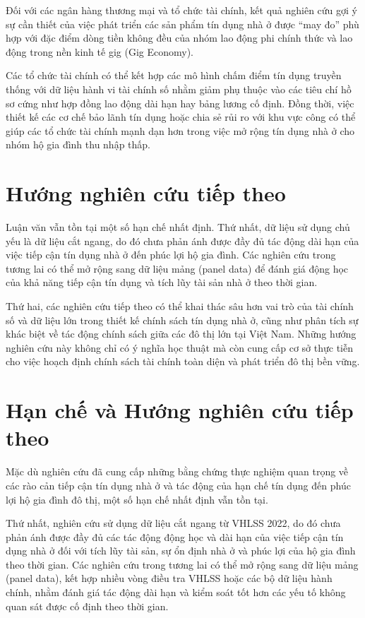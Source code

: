 \documentclass[12pt,a4paper]{report}
\begin{document}
	Đối với các ngân hàng thương mại và tổ chức tài chính, kết quả nghiên cứu gợi ý sự cần thiết của việc phát triển các sản phẩm tín dụng nhà ở được ``may đo'' phù hợp với đặc điểm dòng tiền không đều của nhóm lao động phi chính thức và lao động trong nền kinh tế gig (Gig Economy).
	
	Các tổ chức tài chính có thể kết hợp các mô hình chấm điểm tín dụng truyền thống với dữ liệu hành vi tài chính số nhằm giảm phụ thuộc vào các tiêu chí hồ sơ cứng như hợp đồng lao động dài hạn hay bảng lương cố định. Đồng thời, việc thiết kế các cơ chế bảo lãnh tín dụng hoặc chia sẻ rủi ro với khu vực công có thể giúp các tổ chức tài chính mạnh dạn hơn trong việc mở rộng tín dụng nhà ở cho nhóm hộ gia đình thu nhập thấp.
	
	\section{Hướng nghiên cứu tiếp theo}
	
	Luận văn vẫn tồn tại một số hạn chế nhất định. Thứ nhất, dữ liệu sử dụng chủ yếu là dữ liệu cắt ngang, do đó chưa phản ánh được đầy đủ tác động dài hạn của việc tiếp cận tín dụng nhà ở đến phúc lợi hộ gia đình. Các nghiên cứu trong tương lai có thể mở rộng sang dữ liệu mảng (panel data) để đánh giá động học của khả năng tiếp cận tín dụng và tích lũy tài sản nhà ở theo thời gian.
	
	Thứ hai, các nghiên cứu tiếp theo có thể khai thác sâu hơn vai trò của tài chính số và dữ liệu lớn trong thiết kế chính sách tín dụng nhà ở, cũng như phân tích sự khác biệt về tác động chính sách giữa các đô thị lớn tại Việt Nam. Những hướng nghiên cứu này không chỉ có ý nghĩa học thuật mà còn cung cấp cơ sở thực tiễn cho việc hoạch định chính sách tài chính toàn diện và phát triển đô thị bền vững.
	
	
	\section{Hạn chế và Hướng nghiên cứu tiếp theo}
	
	Mặc dù nghiên cứu đã cung cấp những bằng chứng thực nghiệm quan trọng về các rào cản tiếp cận tín dụng nhà ở và tác động của hạn chế tín dụng đến phúc lợi hộ gia đình đô thị, một số hạn chế nhất định vẫn tồn tại.
	
	Thứ nhất, nghiên cứu sử dụng dữ liệu cắt ngang từ VHLSS 2022, do đó chưa phản ánh được đầy đủ các tác động động học và dài hạn của việc tiếp cận tín dụng nhà ở đối với tích lũy tài sản, sự ổn định nhà ở và phúc lợi của hộ gia đình theo thời gian. Các nghiên cứu trong tương lai có thể mở rộng sang dữ liệu mảng (panel data), kết hợp nhiều vòng điều tra VHLSS hoặc các bộ dữ liệu hành chính, nhằm đánh giá tác động dài hạn và kiểm soát tốt hơn các yếu tố không quan sát được cố định theo thời gian.
	
\end{document}
